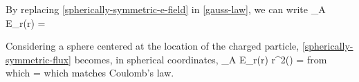 By replacing \ref{spherically-symmetric-e-field} in \ref{gauss-law}, we can write
\be\label{cylindrically-symmetric-flux}
\oiint_A E_r(r) \cdot {} \cdot {} =
\ee

Considering a sphere centered at the location of the charged particle, \ref{spherically-symmetric-flux} becomes, in spherical coordinates,
\be\label{cylindrically-symmetric-flux-2}
\oiint_A E_r(r) \cdot {} \cdot r^{2}\sin(\phi)\theta{}\phi{} =
\ee
from which
\be
{}=
\ee
which matches Coulomb's law.

